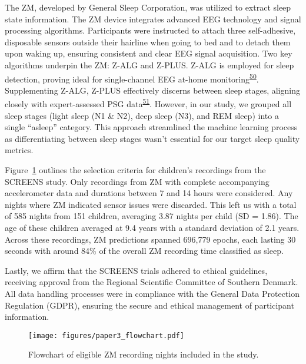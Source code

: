 \documentclass[
  10pt,
]{scrbook}
\begin{document}
The ZM, developed by General Sleep Corporation, was utilized to extract
sleep state information. The ZM device integrates advanced EEG
technology and signal processing algorithms. Participants were
instructed to attach three self-adhesive, disposable sensors outside
their hairline when going to bed and to detach them upon waking up,
ensuring consistent and clear EEG signal acquisition. Two key algorithms
underpin the ZM: Z-ALG and Z-PLUS. Z-ALG is employed for sleep
detection, proving ideal for single-channel EEG at-home
monitoring\textsuperscript{\protect\hyperlink{ref-kaplan_performance_2014}{50}}.
Supplementing Z-ALG, Z-PLUS effectively discerns between sleep stages,
aligning closely with expert-assessed PSG
data\textsuperscript{\protect\hyperlink{ref-wang_evaluation_2015}{51}}.
However, in our study, we grouped all sleep stages (light sleep (N1 \&
N2), deep sleep (N3), and REM sleep) into a single ``asleep'' category.
This approach streamlined the machine learning process as
differentiating between sleep stages wasn't essential for our target
sleep quality metrics.

Figure~\ref{fig-paper3_flow} outlines the selection criteria for
children's recordings from the SCREENS study. Only recordings from ZM
with complete accompanying accelerometer data and durations between 7
and 14 hours were considered. Any nights where ZM indicated sensor
issues were discarded. This left us with a total of 585 nights from 151
children, averaging 3.87 nights per child (SD = 1.86). The age of these
children averaged at 9.4 years with a standard deviation of 2.1 years.
Across these recordings, ZM predictions spanned 696,779 epochs, each
lasting 30 seconds with around 84\% of the overall ZM recording time
classified as sleep.

Lastly, we affirm that the SCREENS trials adhered to ethical guidelines,
receiving approval from the Regional Scientific Committee of Southern
Denmark. All data handling processes were in compliance with the General
Data Protection Regulation (GDPR), ensuring the secure and ethical
management of participant information.

\begin{figure}

{\centering \texttt{[image: figures/paper3\_flowchart.pdf]}

}

\caption{\label{fig-paper3_flow}Flowchart of eligible ZM recording
nights included in the study.}

\end{figure}
\end{document}
